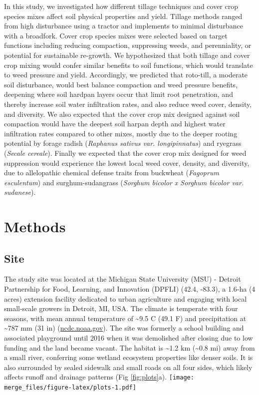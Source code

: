 \documentclass[
  12pt,
]{article}
\begin{document}
In this study, we investigated how different tillage techniques and cover crop species mixes affect soil physical properties and yield.
Tillage methods ranged from high disturbance using a tractor and implements to minimal disturbance with a broadfork.
Cover crop species mixes were selected based on target functions including reducing compaction, suppressing weeds, and perenniality, or potential for sustainable re-growth.
We hypothesized that both tillage and cover crop mixing would confer similar benefits to soil functions, which would translate to weed pressure and yield.
Accordingly, we predicted that roto-till, a moderate soil disturbance, would best balance compaction and weed pressure benefits, deepening where soil hardpan layers occur that limit root penetration, and thereby increase soil water infiltration rates, and also reduce weed cover, density, and diversity.
We also expected that the cover crop mix designed against soil compaction would have the deepest soil harpan depth and highest water infiltration rates compared to other mixes, mostly due to the deeper rooting potential by forage radish (\emph{Raphanus sativus var. longipinnatus}) and ryegrass (\emph{Secale cereale}).
Finally we expected that the cover crop mix designed for weed suppression would experience the lowest local weed cover, density, and diversity, due to allelopathic chemical defense traits from buckwheat (\emph{Fagoprum esculentum}) and surghum-sudangrass (\emph{Sorghum bicolor x Sorghum bicolor var. sudanese}).

\hypertarget{methods}{%
\section{Methods}\label{methods}}

\hypertarget{site}{%
\subsection{Site}\label{site}}

The study site was located at the Michigan State University (MSU) - Detroit Partnership for Food, Learning, and Innovation (DPFLI) (42.4, -83.3), a 1.6-ha (4 acres) extension facility dedicated to urban agriculture and engaging with local small-scale growers in Detroit, MI, USA.
The climate is temperate with four seasons, with mean annual temperature of \textasciitilde9.5 C (49.1 F) and precipitation at \textasciitilde787 mm (31 in) (\url{ncdc.noaa.gov}).
The site was formerly a school building and associated playground until 2016 when it was demolished after closing due to low funding and the land became vacant.
The habitat is \textasciitilde1.2 km (\textasciitilde0.8 mi) away from a small river, conferring some wetland ecosystem properties like denser soils.
It is also surrounded by sealed sidewalk and small roads on all four sides, which likely affects runoff and drainage patterns (Fig \ref{fig:plots}a).
\texttt{[image: merge\_files/figure-latex/plots-1.pdf]}
\end{document}

